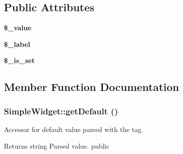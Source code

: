 \subsection*{Public Attributes}
\begin{DoxyCompactItemize}
\item 
\hypertarget{class_simple_widget_a9bf74805e6afd0161b55f09a15845a05}{
{\bfseries \$\_\-value}}
\label{class_simple_widget_a9bf74805e6afd0161b55f09a15845a05}

\item 
\hypertarget{class_simple_widget_ae836a29f1c6482313138a5da944e31f0}{
{\bfseries \$\_\-label}}
\label{class_simple_widget_ae836a29f1c6482313138a5da944e31f0}

\item 
\hypertarget{class_simple_widget_a4cffb16994314af907ecda4e64a53108}{
{\bfseries \$\_\-is\_\-set}}
\label{class_simple_widget_a4cffb16994314af907ecda4e64a53108}

\end{DoxyCompactItemize}


\subsection{Member Function Documentation}
\hypertarget{class_simple_widget_a9c0702cdfee1237b1599cb920ce14ba6}{
\subsubsection[{getDefault}]{\setlength{\rightskip}{0pt plus 5cm}SimpleWidget::getDefault ()}}
\label{class_simple_widget_a9c0702cdfee1237b1599cb920ce14ba6}
Accessor for default value parsed with the tag. \begin{DoxyReturn}{Returns}
string Parsed value.  public 
\end{DoxyReturn}


